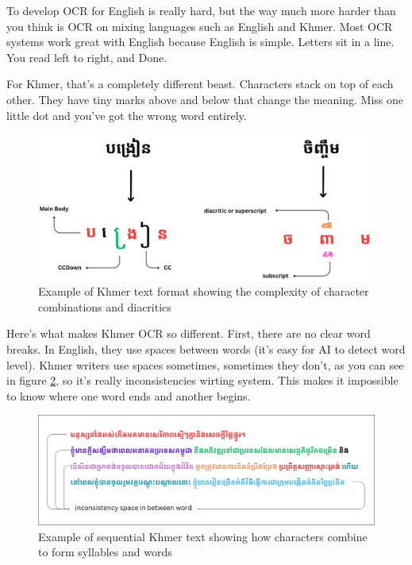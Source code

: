 To develop OCR for English is really hard, but the way much more harder than you think is 
OCR on mixing languages such as English and Khmer. Most OCR systems work great with English because English is simple. Letters sit 
in a line. You read left to right, and Done.

For Khmer, that's a completely different beast. Characters stack on top of each other. 
They have tiny marks above and below that change the meaning. Miss one little dot 
and you've got the wrong word entirely.

\begin{figure}[H]
    \centering
    \includegraphics[width=\textwidth]{figures/example_of_text_format.png}
    \caption{Example of Khmer text format showing the complexity of character combinations and diacritics}
    \label{fig:text_format}
\end{figure}

Here's what makes Khmer OCR so different. First, there are no clear word breaks. 
In English, they use spaces between words (it's easy for AI to detect word level). 
Khmer writers use spaces sometimes, sometimes they don't, as you can see in figure
\ref{fig:sequential_text}, so it's really inconsistencies wirting system. This 
makes it impossible to know where one word ends and another begins.

\begin{figure}[H]
    \centering
    \includegraphics[width=\textwidth]{figures/example_of_long_text.png}
    \caption{Example of sequential Khmer text showing how characters combine to form syllables and words}
    \label{fig:sequential_text}
\end{figure}

